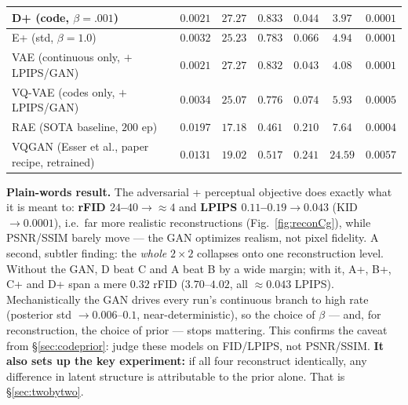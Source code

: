 \documentclass[11pt]{article}
\newcommand{\good}[1]{\textcolor{green!55!black}{#1}}
\newcommand{\bad}[1]{\textcolor{red!70!black}{#1}}
\begin{document}
\begin{table}[h]
\begin{tabular}{lccc ccc}
\textbf{D+} (code, $\beta{=}.001$)& $0.0021$ & $27.27$ & $0.833$ & \good{$0.044$} & \good{$3.97$} & \good{$0.0001$}\\
\midrule
E+ (std, $\beta{=}1.0$)           & $0.0032$ & $25.23$ & $0.783$ & $0.066$ & \bad{$4.94$} & $0.0001$\\
\midrule
VAE (continuous only, $+$LPIPS/GAN) & $0.0021$ & $27.27$ & $0.832$ & \good{$0.043$} & \good{$4.08$} & $0.0001$\\
VQ-VAE (codes only, $+$LPIPS/GAN) & $0.0034$ & $25.07$ & $0.776$ & $0.074$ & $5.93$ & $0.0005$\\
RAE (SOTA baseline, $200$ ep) & $0.0197$ & $17.18$ & $0.461$ & $0.210$ & $7.64$ & $0.0004$\\
VQGAN (Esser et al., paper recipe, retrained) & $0.0131$ & $19.02$ & $0.517$ & $0.241$ & $24.59$ & $0.0057$\\
\bottomrule
\end{tabular}
\end{table}

\textbf{Plain-words result.} The adversarial + perceptual objective does exactly what it is meant
to: \textbf{rFID $24$--$40 \to \approx4$} and \textbf{LPIPS $0.11$--$0.19 \to 0.043$} (KID
$\to 0.0001$), i.e.\ far more realistic reconstructions (Fig.~\ref{fig:reconCg}), while PSNR/SSIM
barely move --- the GAN optimizes realism, not pixel fidelity. A second, subtler finding: the
\emph{whole} $2\times2$ collapses onto one reconstruction level. Without the GAN, D beat C and A
beat B by a wide margin; with it, A+, B+, C+ and D+ span a mere $0.32$ rFID
($3.70$--$4.02$, all $\approx$$0.043$ LPIPS). Mechanistically the GAN drives every run's
continuous branch to high rate (posterior std $\to 0.006$--$0.1$, near-deterministic), so the
choice of $\beta$ --- and, for reconstruction, the choice of prior --- stops mattering. This
confirms the caveat from \S\ref{sec:codeprior}: judge these models on FID/LPIPS, not PSNR/SSIM.
\textbf{It also sets up the key experiment:} if all four reconstruct identically, any difference in
latent structure is attributable to the prior alone. That is \S\ref{sec:twobytwo}.
\end{document}

